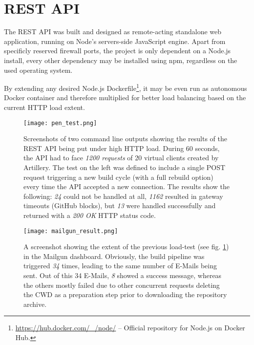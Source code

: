 \section{REST API}
\label{sec:restapi}
The REST API was built and designed as remote-acting standalone web application, running on Node's servers-side JavaScript engine. Apart from specificly reserved firewall ports, the project is only dependent on a Node.js install, every other dependency may be installed using npm, regardless on the used operating system.

By extending any desired Node.js Dockerfile\footnote{\url{https://hub.docker.com/\_/node/} -- Official repository for Node.js on Docker Hub.}, it may be even run as autonomous Docker container and therefore multiplied for better load balancing based on the current HTTP load extent.


\begin{figure}[h] %
    \centering
    \texttt{[image: pen\_test.png]}
    \caption{Screenshots of two command line outputs showing the results of the REST API being put under high HTTP load. During 60 seconds, the API had to face \emph{1200 requests} of 20 virtual clients created by Artillery. The test on the left was defined to include a single POST request triggering a new build cycle (with a full rebuild option) every time the API accepted a new connection. The results show the following: \emph{24} could not be handled at all, \emph{1162} resulted in gateway timeouts (GitHub blocks), but \emph{13} were handled successfully and returned with a \emph{200 OK} HTTP status code.}
    \label{fig:pen-test}
\end{figure}
%

\begin{figure}[h] %
    \centering
    \texttt{[image: mailgun\_result.png]}
    \caption{A screenshot showing the extent of the previous load-test (see fig. \ref{fig:pen-test}) in the Mailgun dashboard. Obviously, the build pipeline was triggered \emph{34} times, leading to the same number of E-Mails being sent. Out of this 34 E-Mails, \emph{8} showed a success message, whereas the others mostly failed due to other concurrent requests deleting the CWD as a preparation step prior to downloading the repository archive.}
    \label{fig:mailgun-result}
\end{figure}
%

